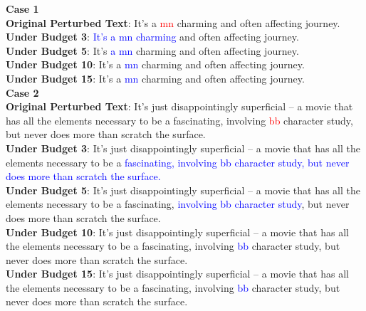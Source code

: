 \begin{tcolorbox}[breakable]
\textbf{Case 1} \\
\textbf{Original Perturbed Text}: It's a \textcolor{red}{mn} charming and often affecting journey.\\
\textbf{Under Budget 3}: \textcolor{blue}{It's a mn charming} and often affecting journey.\\
\textbf{Under Budget 5}: It's \textcolor{blue}{a mn} charming and often affecting journey.\\
\textbf{Under Budget 10}: It's a \textcolor{blue}{mn} charming and often affecting journey.\\
\textbf{Under Budget 15}: It's a \textcolor{blue}{mn} charming and often affecting journey. \\

\textbf{Case 2} \\
\textbf{Original Perturbed Text}: It's just disappointingly superficial -- a movie that has all the elements necessary to be a fascinating, involving \textcolor{red}{bb} character study, but never does more than scratch the surface.\\
\textbf{Under Budget 3}: It's just disappointingly superficial -- a movie that has all the elements necessary to be a \textcolor{blue}{fascinating, involving bb character study, but never does more than scratch the surface.}\\
\textbf{Under Budget 5}: It's just disappointingly superficial -- a movie that has all the elements necessary to be a fascinating, \textcolor{blue}{involving bb character study}, but never does more than scratch the surface.\\
\textbf{Under Budget 10}: It's just disappointingly superficial -- a movie that has all the elements necessary to be a fascinating, involving \textcolor{blue}{bb} character study, but never does more than scratch the surface.\\
\textbf{Under Budget 15}: It's just disappointingly superficial -- a movie that has all the elements necessary to be a fascinating, involving \textcolor{blue}{bb} character study, but never does more than scratch the surface. \\



\end{tcolorbox}
